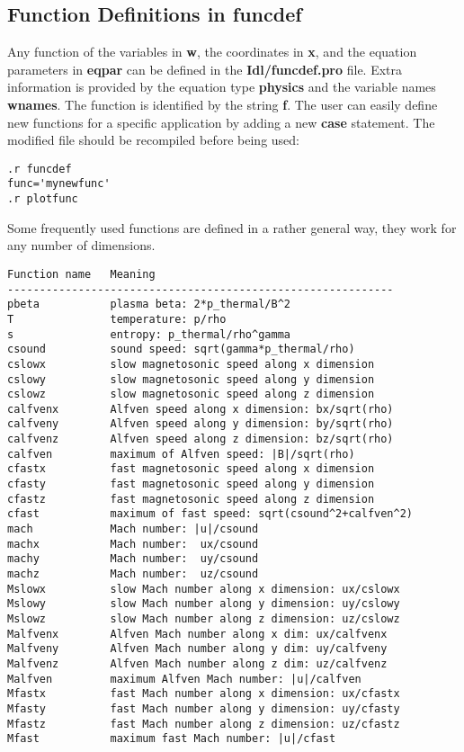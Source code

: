 \subsection{Function Definitions in funcdef \label{s-funcdef}}

   Any function of the variables in {\bf w}, the coordinates in
   {\bf x}, and the equation parameters in {\bf eqpar} can be defined in the 
   {\bf Idl/funcdef.pro} file. Extra information is provided by the equation 
   type {\bf physics} and the variable names {\bf wnames}. The function is 
   identified by the string {\bf f}. The user can easily define new functions
   for a specific application by adding a new {\bf case} statement.
   The modified file should be recompiled before being used:
\begin{verbatim}
.r funcdef
func='mynewfunc'
.r plotfunc
\end{verbatim}
   Some frequently used functions are defined in a rather general way, 
   they work for any number of dimensions. 
\begin{verbatim}
Function name   Meaning
------------------------------------------------------------
pbeta           plasma beta: 2*p_thermal/B^2
T               temperature: p/rho
s               entropy: p_thermal/rho^gamma
csound          sound speed: sqrt(gamma*p_thermal/rho)
cslowx          slow magnetosonic speed along x dimension
cslowy          slow magnetosonic speed along y dimension
cslowz          slow magnetosonic speed along z dimension
calfvenx        Alfven speed along x dimension: bx/sqrt(rho)
calfveny        Alfven speed along y dimension: by/sqrt(rho)
calfvenz        Alfven speed along z dimension: bz/sqrt(rho)
calfven         maximum of Alfven speed: |B|/sqrt(rho)
cfastx          fast magnetosonic speed along x dimension
cfasty          fast magnetosonic speed along y dimension
cfastz          fast magnetosonic speed along z dimension
cfast           maximum of fast speed: sqrt(csound^2+calfven^2)
mach            Mach number: |u|/csound
machx           Mach number:  ux/csound
machy           Mach number:  uy/csound
machz           Mach number:  uz/csound
Mslowx          slow Mach number along x dimension: ux/cslowx
Mslowy          slow Mach number along y dimension: uy/cslowy
Mslowz          slow Mach number along z dimension: uz/cslowz
Malfvenx        Alfven Mach number along x dim: ux/calfvenx
Malfveny        Alfven Mach number along y dim: uy/calfveny
Malfvenz        Alfven Mach number along z dim: uz/calfvenz
Malfven         maximum Alfven Mach number: |u|/calfven
Mfastx          fast Mach number along x dimension: ux/cfastx
Mfasty          fast Mach number along y dimension: uy/cfasty
Mfastz          fast Mach number along z dimension: uz/cfastz
Mfast           maximum fast Mach number: |u|/cfast
\end{verbatim}

